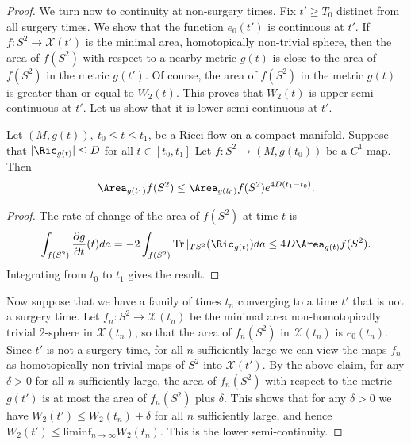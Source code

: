 \begin{proof}
We turn now to continuity at non-surgery times. Fix $t'\ge T_0$
distinct from all surgery times. We show that  the function
$e_0(t')$ is continuous at $t'$. If $f\colon S^2\to {\mathcal
X}(t')$ is the minimal area, homotopically non-trivial sphere, then
the area of $f(S^2)$ with respect to a nearby metric $g(t)$ is close
to the area of $f(S^2)$ in the metric $g(t')$. Of course, the area
of $f(S^2)$ in the metric $g(t)$ is greater than or equal to
$W_2(t)$. This proves that $W_2(t)$ is  upper semi-continuous at
$t'$. Let us show that it is lower semi-continuous at  $t'$.

\begin{claim}
\label{claim:sphere-area-growth-bound}
Let $(M,g(t)),\ t_0\le t\le t_1$, be a Ricci flow on a compact
manifold. Suppose that $|\Ric_{g(t)}|\le D$ for all $t\in
[t_0,t_1]$ Let $f\colon S^2\to (M,g(t_0))$ be a $C^1$-map. Then
$$\Area_{g(t_1)}f(S^2)\le \Area_{g(t_0)}f(S^2)e^{4D(t_1-t_0)}.$$
\end{claim}

\begin{proof}
The rate of change of the area of $f(S^2)$ at time $t$ is
$$\int_{f(S^2)}\frac{\partial g}{\partial t}(t)da=-2\int_{f(S^2)}\operatorname{Tr}|_{TS^2}(\Ric_{g(t)})da\le
4D\Area_{g(t)}f(S^2) .$$ Integrating from $t_0$ to $t_1$ gives
the result.
\end{proof}

Now suppose that we have a family of times $t_n$ converging to a
time $t'$ that is not a surgery time. Let $f_n\colon S^2\to
{\mathcal X}(t_n)$ be the minimal area non-homotopically trivial
$2$-sphere in ${\mathcal X}(t_n)$, so that the area of $f_n(S^2)$ in
${\mathcal X}(t_n)$ is $e_0(t_n)$. Since $t'$ is not a surgery time,
for all $n$ sufficiently large we can view the maps $f_n$ as
homotopically non-trivial maps of $S^2$ into ${\mathcal X}(t')$. By
the above claim, for any $\delta>0$ for all $n$ sufficiently large,
the area of $f_n(S^2)$ with respect to the metric $g(t')$ is at most
the area of $f_n(S^2)$ plus $\delta$. This shows that for any
$\delta>0$ we have $W_2(t')\le W_2(t_n)+\delta$ for all $n$
sufficiently large, and hence $W_2(t')\le \mathrm{liminf}_{n\rightarrow\infty}W_2(t_n)$. This is the lower
semi-continuity.




\end{proof}
